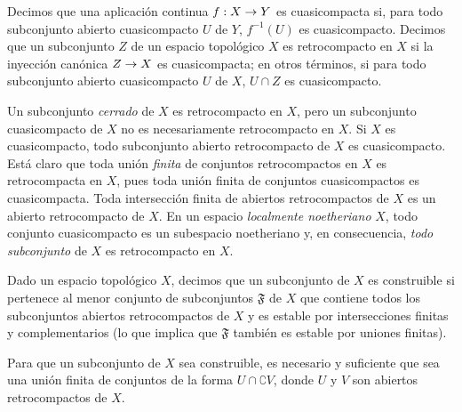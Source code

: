\documentclass[oneside]{amsart}
\makeatletter
\newcommand{\ega@arrow}[2]{\mathchoice{#1}{#2}{#2}{#2}}
\renewcommand{\to}{\ega@arrow{\longrightarrow}{\rightarrow}}
\let\EGAOriginalLabel\label
\renewcommand{\label}[1]{\phantomsection\EGAOriginalLabel{#1}}
\makeatother
\begin{document}
\begin{definition}[9.1.1]
\label{0.9.1.1}
Decimos que una aplicación continua $f:X\to Y$ es cuasicompacta si, para todo subconjunto abierto cuasicompacto $U$ de $Y$, $f^{-1}(U)$ es cuasicompacto.
Decimos que un subconjunto $Z$ de un espacio topológico $X$ es retrocompacto en $X$ si la inyección canónica $Z\to X$ es cuasicompacta; en otros términos, si para todo subconjunto abierto cuasicompacto $U$ de $X$, $U\cap Z$ es cuasicompacto.
\end{definition}

Un subconjunto \emph{cerrado} de $X$ es retrocompacto en $X$, pero un subconjunto cuasicompacto de $X$ no es necesariamente retrocompacto en $X$.
Si $X$ es cuasicompacto, todo subconjunto abierto retrocompacto de $X$ es cuasicompacto.
Está claro que toda unión \emph{finita} de conjuntos retrocompactos en $X$ es retrocompacta en $X$, pues toda unión finita de conjuntos cuasicompactos es cuasicompacta.
Toda intersección finita de abiertos retrocompactos de $X$ es un abierto retrocompacto de $X$.
En un espacio \emph{localmente noetheriano} $X$, todo conjunto cuasicompacto es un subespacio noetheriano y, en consecuencia, \emph{todo subconjunto} de $X$ es retrocompacto en $X$.

\begin{definition}[9.1.2]
\label{0.9.1.2}
Dado un espacio topológico $X$, decimos que un subconjunto de $X$ es construible si pertenece al menor conjunto de subconjuntos $\mathfrak{F}$ de $X$ que contiene todos los subconjuntos abiertos retrocompactos de $X$ y es estable por intersecciones finitas y complementarios \textup{(lo que implica que $\mathfrak{F}$ también es} estable por uniones finitas\textup{)}.
\end{definition}

\begin{proposition}[9.1.3]
\label{0.9.1.3}
Para que un subconjunto de $X$ sea construible, es necesario y suficiente que sea una unión finita de conjuntos de la forma $U\cap\complement{V}$, donde $U$ y $V$ son abiertos retrocompactos de $X$.
\end{proposition}
\end{document}
